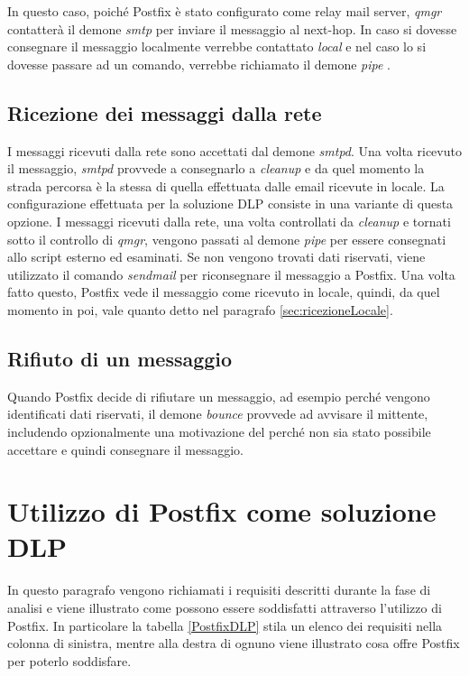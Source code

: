   In questo caso, poiché Postfix è stato configurato come relay mail server, 
  \textit{qmgr} contatterà il demone \textit{smtp} per inviare il messaggio al next-hop. In caso si dovesse consegnare 
  il messaggio localmente verrebbe contattato \textit{local} e nel caso lo si dovesse passare ad un comando, 
  verrebbe richiamato il demone \textit{pipe} \cite{Postfix2}.
  
  \subsection{Ricezione dei messaggi dalla rete}
  I messaggi ricevuti dalla rete sono accettati dal demone \textit{smtpd}. Una volta ricevuto il messaggio, 
  \textit{smtpd} provvede a consegnarlo a \textit{cleanup} e da quel momento la strada percorsa 
  è la stessa di quella effettuata dalle email ricevute in locale.
  La configurazione effettuata per la soluzione DLP consiste in una variante di questa opzione.
  I messaggi ricevuti dalla rete, una volta controllati da \textit{cleanup}
  e tornati sotto il controllo di \textit{qmgr}, vengono passati al demone \textit{pipe} 
  per essere consegnati allo script esterno ed esaminati.
  Se non vengono trovati dati riservati, viene utilizzato il comando \textit{sendmail} per riconsegnare 
  il messaggio a Postfix. 
  Una volta fatto questo, Postfix vede il messaggio come ricevuto in locale, quindi, da quel momento in poi, 
  vale quanto detto nel paragrafo \ref{sec:ricezioneLocale}.
  
  \subsection{Rifiuto di un messaggio}
  Quando Postfix decide di rifiutare un messaggio, ad esempio perché vengono identificati dati riservati, 
  il demone \textit{bounce} provvede ad avvisare il mittente, includendo opzionalmente una motivazione del perché non
  sia stato possibile accettare e quindi consegnare il messaggio.
  
  \section{Utilizzo di Postfix come soluzione DLP}
  In questo paragrafo vengono richiamati i requisiti descritti durante la fase di analisi e 
  viene illustrato come possono essere soddisfatti attraverso l'utilizzo di Postfix. In particolare la tabella
  \ref{PostfixDLP} stila un elenco dei requisiti nella colonna di sinistra, mentre alla destra di ognuno viene illustrato
  cosa offre Postfix per poterlo soddisfare.
  
